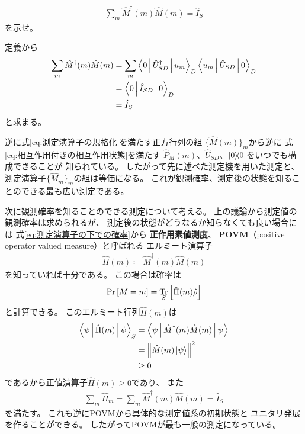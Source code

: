 \documentclass[a4paper, 10pt, uplatex]{jsarticle}
\begin{document}
\begin{problem}
	\begin{align}
		\sum_m \hat{M}^\dagger (m) \hat{M} (m) = \hat{I}_S
		\label{eq:測定演算子の規格化}
	\end{align}
	を示せ。

	\tcblower

	定義から
	\begin{align}
		\sum_m \hat{M}^\dagger (m) \hat{M} (m)
		&= \sum_m \Braket{0 | \hat{U}^\dagger_{SD} | u_m}_D
		\Braket{u_m | \hat{U}_{SD} | 0}_D \\
		&= \Braket{0 | \hat{I}_{SD} | 0}_D \\
		&= \hat{I}_S
	\end{align}
	と求まる。
\end{problem}
逆に式\eqref{eq:測定演算子の規格化}を満たす正方行列の組
$\{ \hat{M} \left( m \right) \}_m$から逆に
式\eqref{eq:相互作用付きの相互作用状態}を満たす
$\hat{P}_M (m)$、$\hat{U}_{SD}$、$\Ket{0} \! \! \Bra{0}$をいつでも構成できることが
知られている。
したがって先に述べた測定機を用いた測定と、
測定演算子$\{ \hat{M}_m \}_m$の組は等価になる。
これが観測確率、測定後の状態を知ることのできる最も広い測定である。

次に観測確率を知ることのできる測定について考える。
上の議論から測定値の観測確率は求められるが、
測定後の状態がどうなるか知らなくても良い場合には
式\eqref{eq:測定演算子の下での確率}から
\textbf{正作用素値測度}、
\textbf{POVM}（positive operator valued measure）と呼ばれる
エルミート演算子
\begin{align}
	\hat{\Pi} (m) \coloneqq \hat{M}^\dagger (m) \hat{M} (m)
\end{align}
を知っていれば十分である。
この場合は確率は
\begin{align}
	\Pr \left[ M = m \right] = \operatorname*{Tr}_S \left[ \hat{\Pi} (m) \hat{\rho} \right]
\end{align}
と計算できる。
このエルミート行列$\hat{\Pi} (m)$は
\begin{align}
	\Braket{\psi | \hat{\Pi} (m) | \psi}_S
	&= \Braket{\psi | \hat{M}^\dagger (m) \hat{M} (m) | \psi} \\
	&= \left\| \hat{M} (m) \Ket{\psi} \right\|^2 \\
	&\geq 0
\end{align}
であるから正値演算子$\hat{\Pi} (m) \geq 0$であり、
また
\begin{align}
	\sum_m \hat{\Pi}_m = \sum_m \hat{M}^\dagger (m) \hat{M} (m)
	= \hat{I}_S
\end{align}
を満たす。
これも逆にPOVMから具体的な測定値系の初期状態と
ユニタリ発展を作ることができる。
したがってPOVMが最も一般の測定になっている。
\end{document}

